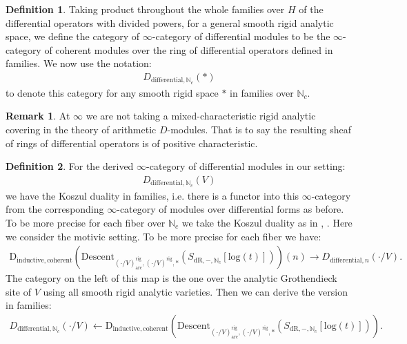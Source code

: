 \documentclass[12pt]{article}
\theoremstyle{definition}
\newtheorem{remark}{Remark}
\newtheorem{definition}{Definition}
\begin{document}
\begin{definition}
Taking product throughout the whole families over $H$ of the differential operators with divided powers, for a general smooth rigid analytic space, we define the category of $\infty$-category of differential modules to be the $\infty$-category of coherent modules over the ring of differential operators defined in families. We now use the notation:
\begin{align}
D_{\mathrm{differential},\mathbb{N}_c}(*)
\end{align}
to denote this category for any smooth rigid space $*$ in families over $\mathbb{N}_c$.
\end{definition}

\begin{remark}
At $\infty$ we are not taking a mixed-characteristic rigid analytic covering in the theory of arithmetic $D$-modules. That is to say the resulting sheaf of rings of differential operators is of positive characteristic.
\end{remark}



\begin{definition}
For the derived $\infty$-category of differential modules in our setting:
\begin{align}
D_{\mathrm{differential},\mathbb{N}_c}(V)
\end{align}
we have the Koszul duality in families, i.e. there is a functor into this $\infty$-category from the corresponding $\infty$-category of modules over differential forms as before. To be more precise for each fiber over $\mathbb{N}_c$ we take the Koszul duality as in \cite{5BLA}, \cite{5BLB}. Here we consider the motivic setting. To be more precise for each fiber we have:
\begin{align}
\mathrm{D}_{\mathrm{inductive},\mathrm{coherent}}(\mathrm{Descent}_{(\cdot/V)^\mathrm{rig}_\mathrm{arc},(\cdot/V)^\mathrm{rig},*}(S_{\mathrm{dR},-,\mathbb{N}_c}[\mathrm{log}(t)]))(n)\rightarrow D_{\mathrm{differential},n}(\cdot/V). 
\end{align}
The category on the left of this map is the one over the analytic Grothendieck site of $V$ using all smooth rigid analytic varieties. Then we can derive the version in families:
\begin{align}
D_{\mathrm{differential},\mathbb{N}_c}(\cdot/V)\leftarrow \mathrm{D}_{\mathrm{inductive},\mathrm{coherent}}(\mathrm{Descent}_{(\cdot/V)^\mathrm{rig}_\mathrm{arc},(\cdot/V)^\mathrm{rig},*}(S_{\mathrm{dR},-,\mathbb{N}_c}[\mathrm{log}(t)])). 
\end{align}
\end{definition}
\end{document}

